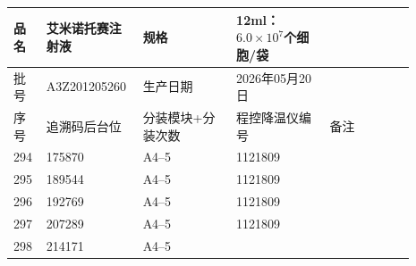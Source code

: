 \documentclass[UTF8,10pt,a4paper,fontset=fandol]{ctexart}
\newcommand{\fieldvalue}[1]{#1}
\begin{document}
\newpage

\begin{center}
\small
\begin{tabular}{|p{0.07\linewidth}|p{0.18\linewidth}|p{0.22\linewidth}|p{0.22\linewidth}|p{0.20\linewidth}|}
\hline
品名 &
\fieldvalue{艾米诺托赛注射液} &
规格 &
\fieldvalue{12ml：$6.0\times10^{7}$个细胞/袋} &
\\ \hline
批号 &
\fieldvalue{A3Z201205260} &
生产日期 &
\fieldvalue{2026年05月20日} &
\\ \hline
序号 & 追溯码后台位 & 分装模块+分装次数 & 程控降温仪编号 & 备注 \\
\hline
\fieldvalue{294} &
\fieldvalue{175870} &
\fieldvalue{A4--5} &
\fieldvalue{1121809} & \\ \hline
\fieldvalue{295} &
\fieldvalue{189544} &
\fieldvalue{A4--5} &
\fieldvalue{1121809} & \\ \hline
\fieldvalue{296} &
\fieldvalue{192769} &
\fieldvalue{A4--5} &
\fieldvalue{1121809} & \\ \hline
\fieldvalue{297} &
\fieldvalue{207289} &
\fieldvalue{A4--5} &
\fieldvalue{1121809} & \\ \hline
\fieldvalue{298} &
\fieldvalue{214171} &
\fieldvalue{A4--5} &

\end{tabular}
\end{center}
\end{document}
